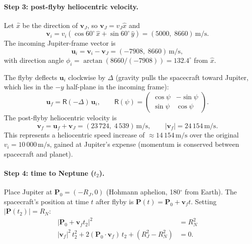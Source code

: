 \documentclass[11pt, a4paper]{article}
\newcommand{\unit}[1]{\,\mathrm{#1}}
\begin{document}
\paragraph{Step 3: post-flyby heliocentric velocity.}

Let $\hat{x}$ be the direction of $\mathbf{v}_J$, so
$\mathbf{v}_J = v_J\hat{x}$ and
\[
  \mathbf{v}_i = v_i(\cos 60^\circ\,\hat{x} + \sin 60^\circ\,\hat{y})
               = (5000,\;8660)\unit{m/s.}
\]
The incoming Jupiter-frame vector is
\[
  \mathbf{u}_i = \mathbf{v}_i - \mathbf{v}_J = (-7908,\;8660)\unit{m/s,}
\]
with direction angle $\phi_i = \arctan(8660/(-7908)) = 132.4^\circ$ from $\hat{x}$.

The flyby deflects $\mathbf{u}_i$ clockwise by $\Delta$ (gravity pulls the spacecraft
toward Jupiter, which lies in the $-y$ half-plane in the incoming frame):
\begin{equation}
  \mathbf{u}_f = \mathsf{R}(-\Delta)\,\mathbf{u}_i, \qquad
  \mathsf{R}(\psi) = \begin{pmatrix}\cos\psi & -\sin\psi\\
                                     \sin\psi &  \cos\psi\end{pmatrix}.
  \label{eq:rotation}
\end{equation}
The post-flyby heliocentric velocity is
\begin{equation}
  \mathbf{v}_f = \mathbf{u}_f + \mathbf{v}_J = (23\,724,\;4\,539)\unit{m/s},
  \qquad |\mathbf{v}_f| = 24\,154\unit{m/s.}
\end{equation}
This represents a heliocentric speed increase of $\approx 14\,154\unit{m/s}$ over the
original $v_i = 10\,000\unit{m/s}$, gained at Jupiter's expense (momentum is
conserved between spacecraft and planet).

\paragraph{Step 4: time to Neptune ($t_2$).}

Place Jupiter at $\mathbf{P}_0 = (-R_J, 0)$ (Hohmann aphelion, 180$^\circ$ from Earth).
The spacecraft's position at time $t$ after flyby is $\mathbf{P}(t) = \mathbf{P}_0 + \mathbf{v}_f t$.
Setting $|\mathbf{P}(t_2)| = R_N$:
\begin{align}
  |\mathbf{P}_0 + \mathbf{v}_f t_2|^2 &= R_N^2 \nonumber\\
  |\mathbf{v}_f|^2\,t_2^2 + 2(\mathbf{P}_0\cdot\mathbf{v}_f)\,t_2
  + (R_J^2 - R_N^2) &= 0.
  \label{eq:quadratic}
\end{align}
\end{document}
